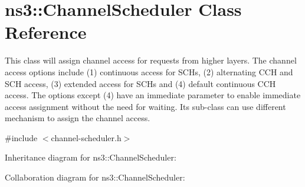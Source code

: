 \hypertarget{classns3_1_1ChannelScheduler}{}\section{ns3\+:\+:Channel\+Scheduler Class Reference}
\label{classns3_1_1ChannelScheduler}


This class will assign channel access for requests from higher layers. The channel access options include (1) continuous access for S\+C\+Hs, (2) alternating C\+CH and S\+CH access, (3) extended access for S\+C\+Hs and (4) default continuous C\+CH access. The options except (4) have an immediate parameter to enable immediate access assignment without the need for waiting. Its sub-\/class can use different mechanism to assign the channel access.  




{\ttfamily \#include $<$channel-\/scheduler.\+h$>$}



Inheritance diagram for ns3\+:\+:Channel\+Scheduler\+:


Collaboration diagram for ns3\+:\+:Channel\+Scheduler\+:
